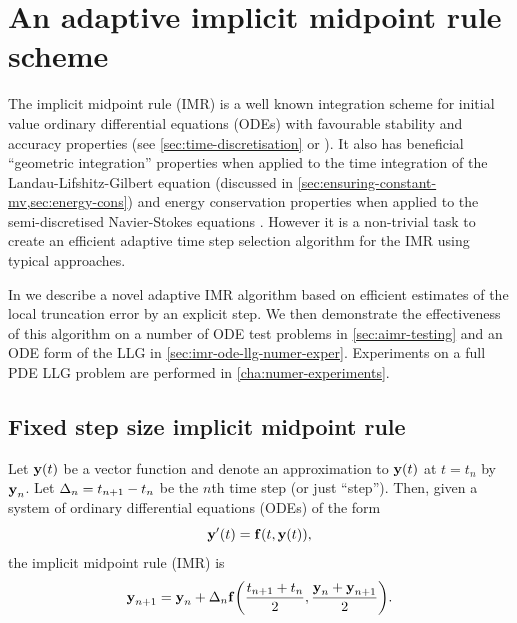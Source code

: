 






\chapter{An adaptive implicit midpoint rule scheme}
\label{sec:adaptive-imr}


The implicit midpoint rule (IMR) is a well known integration scheme for initial value ordinary differential equations (ODEs) with favourable stability and accuracy properties (see \cref{sec:time-discretisation} or \cite[204]{HairerNorsettWanner}).
It also has beneficial ``geometric integration'' properties when applied to the time integration of the Landau-Lifshitz-Gilbert equation (discussed in
\cref{sec:ensuring-constant-mv,sec:energy-cons}) and energy conservation properties when applied to the semi-discretised Navier-Stokes equations \cite{Sanderse2013}.
However it is a non-trivial task to create an efficient adaptive time step selection algorithm for the IMR using typical approaches.

In  we describe a novel adaptive IMR algorithm based on efficient estimates of the local truncation error by an explicit step.
We then demonstrate the effectiveness of this algorithm on a number of ODE test problems in \cref{sec:aimr-testing} and an ODE form of the LLG in \cref{sec:imr-ode-llg-numer-exper}.
Experiments on a full PDE LLG problem are performed in \cref{cha:numer-experiments}.


\section{Fixed step size implicit midpoint rule}
\label{sec:fixed-step-implicit}

Let $\boldsymbol{\mathrm{y}}(t)$ be a vector function and denote an approximation to $\boldsymbol{\mathrm{y}}(t)$ at $t = t_n$ by $\boldsymbol{\mathrm{y}}_n$.
Let $\Delta_{n} = t_{n+1} - t_n$ be the $n$th time step (or just ``step'').
Then, given a system of ordinary differential equations (ODEs) of the form
\begin{equation}
  \boldsymbol{\mathrm{y}}'(t) = {\boldsymbol{\mathrm{f}}{\left( t, \boldsymbol{\mathrm{y}}(t) \right)}},
  \label{eq:43}
\end{equation}
the implicit midpoint rule (IMR) is
\begin{equation}
    \boldsymbol{\mathrm{y}}_{n+1} = \boldsymbol{\mathrm{y}}_n + \Delta_{n} {\boldsymbol{\mathrm{f}}{\left( \frac{t_{n+1} + t_n}{2}, \frac{\boldsymbol{\mathrm{y}}_n + \boldsymbol{\mathrm{y}}_{n+1}}{2} \right)}}.
    \label{eq:67}
\end{equation}

